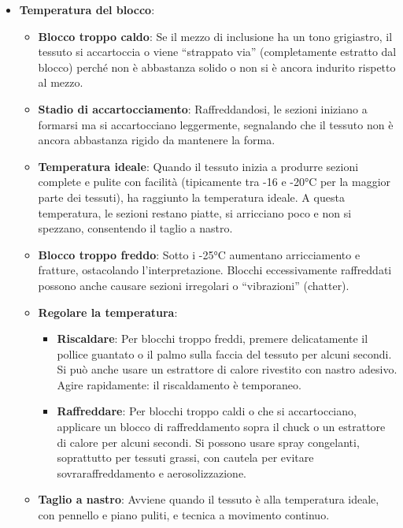 \begin{itemize}
\item \textbf{Temperatura del blocco}:
\begin{itemize}
\item \textbf{Blocco troppo caldo}: Se il mezzo di inclusione ha un tono grigiastro, il tessuto si accartoccia o viene “strappato via” (completamente estratto dal blocco) perché non è abbastanza solido o non si è ancora indurito rispetto al mezzo.
\item \textbf{Stadio di accartocciamento}: Raffreddandosi, le sezioni iniziano a formarsi ma si accartocciano leggermente, segnalando che il tessuto non è ancora abbastanza rigido da mantenere la forma.
\item \textbf{Temperatura ideale}: Quando il tessuto inizia a produrre sezioni complete e pulite con facilità (tipicamente tra -16 e -20°C per la maggior parte dei tessuti), ha raggiunto la temperatura ideale. A questa temperatura, le sezioni restano piatte, si arricciano poco e non si spezzano, consentendo il taglio a nastro.
\item \textbf{Blocco troppo freddo}: Sotto i -25°C aumentano arricciamento e fratture, ostacolando l'interpretazione. Blocchi eccessivamente raffreddati possono anche causare sezioni irregolari o “vibrazioni” (chatter).
\item \textbf{Regolare la temperatura}:
\begin{itemize}
\item \textbf{Riscaldare}: Per blocchi troppo freddi, premere delicatamente il pollice guantato o il palmo sulla faccia del tessuto per alcuni secondi. Si può anche usare un estrattore di calore rivestito con nastro adesivo. Agire rapidamente: il riscaldamento è temporaneo.
\item \textbf{Raffreddare}: Per blocchi troppo caldi o che si accartocciano, applicare un blocco di raffreddamento sopra il chuck o un estrattore di calore per alcuni secondi. Si possono usare spray congelanti, soprattutto per tessuti grassi, con cautela per evitare sovraraffreddamento e aerosolizzazione.
\end{itemize}
\item \textbf{Taglio a nastro}: Avviene quando il tessuto è alla temperatura ideale, con pennello e piano puliti, e tecnica a movimento continuo.
\end{itemize}


\end{itemize}
